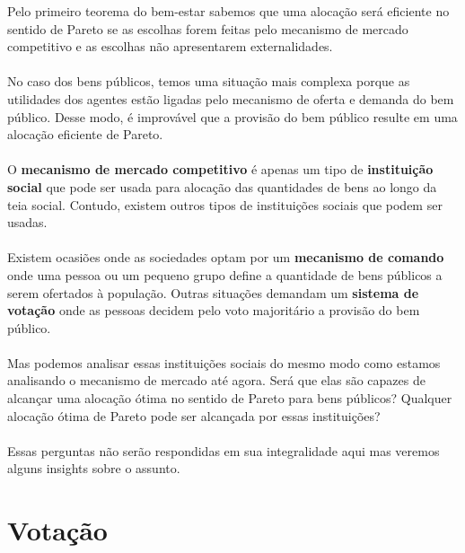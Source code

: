 \documentclass[a4paper,11pt,oneside]{book}
\theoremstyle{definition}
\theoremstyle{break}
\begin{document}
Pelo primeiro teorema do bem-estar sabemos que uma alocação será eficiente no sentido de Pareto se as escolhas forem feitas pelo mecanismo de mercado competitivo e as escolhas não apresentarem externalidades.
\\~\\
No caso dos bens públicos, temos uma situação mais complexa porque as utilidades dos agentes estão ligadas pelo mecanismo de oferta e demanda do bem público. Desse modo, é improvável que a provisão do bem público resulte em uma alocação eficiente de Pareto.
\\~\\
O \textbf{mecanismo de mercado competitivo} é apenas um tipo de \textbf{instituição social} que pode ser usada para alocação das quantidades de bens ao longo da teia social. Contudo, existem outros tipos de instituições sociais que podem ser usadas.
\\~\\
Existem ocasiões onde as sociedades optam por um \textbf{mecanismo de comando} onde uma pessoa ou um pequeno grupo define a quantidade de bens públicos a serem ofertados à população. Outras situações demandam um \textbf{sistema de votação} onde as pessoas decidem pelo voto majoritário a provisão do bem público.
\\~\\
Mas podemos analisar essas instituições sociais do mesmo modo como estamos analisando o mecanismo de mercado até agora. Será que elas são capazes de alcançar uma alocação ótima no sentido de Pareto para bens públicos? Qualquer alocação ótima de Pareto pode ser alcançada por essas instituições?
\\~\\
Essas perguntas não serão respondidas em sua integralidade aqui mas veremos alguns insights sobre o assunto.

\section{Votação}
\end{document}
